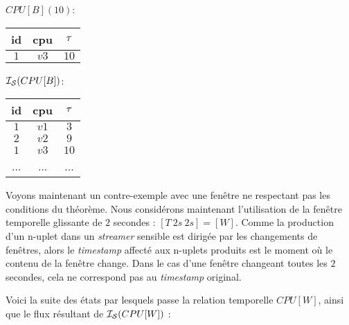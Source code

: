\begin{example}
\begin{minipage}[c]{0.24\linewidth}
\begin{center}$CPU[B](10)$: \\ \vspace{1em}
\begin{tabular}{|c|c|c|}
\hline
id & cpu & $\tau$ \\
\hline
$1$ & $v3$ & $10$ \\
\hline
\end{tabular}\end{center}
\end{minipage} %
\begin{minipage}[c]{0.24\linewidth}
\begin{center}$\mathcal{I_S}(CPU[B])$: \\
\begin{tabular}{|c|c|c|}
\hline
id & cpu & $\tau$ \\ \hline
$1$ & $v1$ & $3$ \\ \hline
$2$ & $v2$ & $9$ \\ \hline
$1$ & $v3$ & $10$ \\ \hline
... & ... & ... \\ \hline
\end{tabular}\end{center}
\end{minipage} %

Voyons maintenant un contre-exemple avec une fenêtre ne respectant pas les conditions du théorème. Nous considérons maintenant l'utilisation de la fenêtre temporelle glissante de $2$ secondes : $[T\ 2s\ 2s]=[W]$. Comme la production d'un n-uplet dans un \textit{streamer} sensible est dirigée par les changements de fenêtres, alors le \textit{timestamp} affecté aux n-uplets produits est le moment où le contenu de la fenêtre change. Dans le cas d'une fenêtre changeant toutes les $2$ secondes, cela ne correspond pas au \textit{timestamp} original.

Voici la suite des états par lesquels passe la relation temporelle $CPU[W]$, ainsi que le flux résultant de $\mathcal{I_S}(CPU[W])$ :


\end{example}
